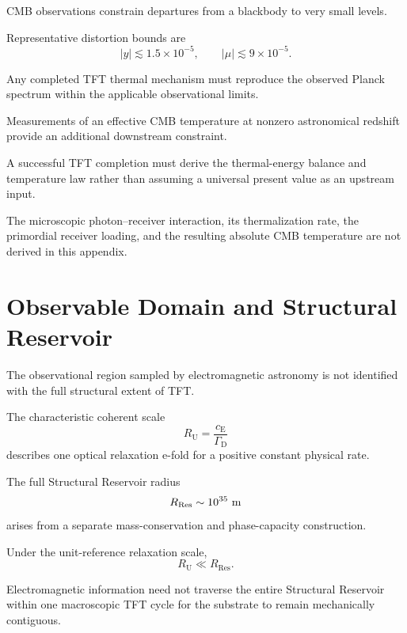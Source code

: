 CMB observations constrain departures from a blackbody to very small levels.

Representative distortion bounds are
\begin{equation}
    |y|
    \lesssim
    1.5\times10^{-5},
    \qquad
    |\mu|
    \lesssim
    9\times10^{-5}.
    \label{eq:AR_FIRAS}
\end{equation}

Any completed TFT thermal mechanism must reproduce the observed Planck
spectrum within the applicable observational limits.

Measurements of an effective CMB temperature at nonzero astronomical redshift
provide an additional downstream constraint.

A successful TFT completion must derive the thermal-energy balance and
temperature law rather than assuming a universal present value as an upstream
input.

The microscopic photon--receiver interaction, its thermalization rate, the
primordial receiver loading, and the resulting absolute CMB temperature are
not derived in this appendix.


\section{Observable Domain and Structural Reservoir}

The observational region sampled by electromagnetic astronomy is not
identified with the full structural extent of TFT.

The characteristic coherent scale
\begin{equation}
    R_{\mathrm U}
    =
    \frac{
        c_{\mathrm E}
    }{
        \Gamma_{\mathrm D}
    }
\end{equation}
describes one optical relaxation e-fold for a positive constant physical rate.

The full Structural Reservoir radius
\begin{equation}
    R_{\mathrm{Res}}
    \sim
    10^{35}\ {\rm m}
\end{equation}
arises from a separate mass-conservation and phase-capacity construction.

Under the unit-reference relaxation scale,
\begin{equation}
    \boxed{
    R_{\mathrm U}
    \ll
    R_{\mathrm{Res}}.
    }
    \label{eq:AR_scale_hierarchy}
\end{equation}

Electromagnetic information need not traverse the entire Structural Reservoir
within one macroscopic TFT cycle for the substrate to remain mechanically
contiguous.

